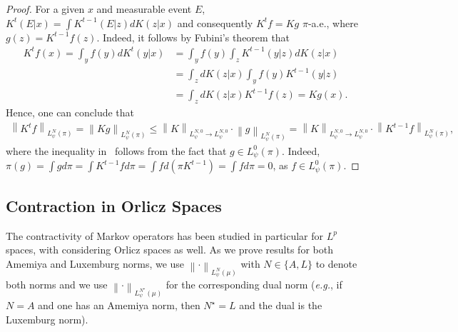 \documentclass[11pt]{article}
\theoremstyle{plain}
\theoremstyle{remark}
\begin{document}
\begin{proof}
    For a given $x$ and measurable event $E$, $K^t(E|x) = \int K^{t-1}(E|z) dK(z|x)$ and consequently $K^tf = Kg$ $\pi$-a.e., where $g(z) = K^{t-1}f(z)$. Indeed, it follows by Fubini's theorem that
    \begin{align}
        K^tf(x) = \int_y f(y) dK^t(y|x) &= \int_y f(y) \int_z K^{t-1}(y|z) dK(z|x)  \\ &=  \int_z dK(z|x) \int_y f(y) K^{t-1}(y|z) \\ &= \int_z dK(z|x) K^{t-1}f(z) = Kg(x).
    \end{align}
    Hence, one can conclude that
    \begin{align}
         \left\lVert K^t f\right\rVert_{L_\psi^N(\pi)} = \left\lVert Kg \right\rVert_{L_\psi^N(\pi)} \leq \left\lVert K\right\rVert_{L_\psi^{N,0}\to L_\psi^{N,0}} \cdot  \left\lVert  g \right\rVert_{L_\psi^N(\pi)} = \left\lVert K\right\rVert_{L_\psi^{N,0}\to L_\psi^{N,0}} \cdot  \left\lVert  K^{t-1}f\right\rVert_{L_\psi^N(\pi)}, \label{eq:contractionNthPower}
    \end{align}
 where the inequality in~ follows from the fact that $g \in L_\psi^0(\pi)$. Indeed, $\pi(g) = \int g d\pi = \int K^{t-1}f d\pi = \int f d(\pi K^{t-1}) = \int f d\pi = 0$, as $f\in L_\psi^0(\pi).$ 
\end{proof}
\subsection{Contraction in Orlicz Spaces}
 The %
    contractivity of Markov operators has been %
    studied in particular for $L^p$ spaces, with \cite{contractionLedoux, hypercontractivityMarkovSemigroupsOrlicz} %
    considering %
    Orlicz spaces as well. As we %
     prove results for both Amemiya and Luxemburg norms, %
    we use $\left\lVert \cdot \right\rVert_{L_\psi^N(\mu)}$ with $N\in \{A,L\}$ to denote both norms and we use $\left\lVert \cdot \right\rVert_{L_\psi^{N^\star}(\mu)}$ for the corresponding dual norm (\textit{e.g.}, if $N=A$ and one has an Amemiya norm, then $N^\star = L$ and the dual is the Luxemburg norm).
    
    
    
\end{document}
